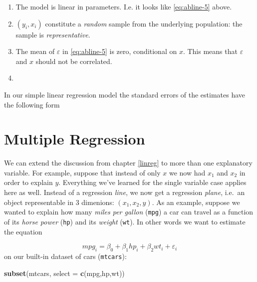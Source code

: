 \documentclass[]{book}
\newenvironment{Shaded}{\begin{snugshade}}{\end{snugshade}}
\newcommand{\KeywordTok}[1]{\textcolor[rgb]{0.13,0.29,0.53}{\textbf{#1}}}
\newcommand{\DataTypeTok}[1]{\textcolor[rgb]{0.13,0.29,0.53}{#1}}
\newcommand{\NormalTok}[1]{#1}
\theoremstyle{definition}
\theoremstyle{definition}
\theoremstyle{definition}
\theoremstyle{remark}
\begin{document}
\begin{enumerate}
\def\labelenumi{\arabic{enumi}.}
\item
  The model is linear in parameters. I.e. it looks like
  \eqref{eq:abline-5} above.
\item
  \((y_i,x_i)\) constitute a \emph{random} sample from the underlying
  population: the sample is \emph{representative}.
\item
  The mean of \(\varepsilon\) in \eqref{eq:abline-5} is zero, conditional
  on \(x\). This means that \(\varepsilon\) and \(x\) should not be
  correlated.
\item
\end{enumerate}

In our simple linear regression model the standard errors of the
estimates have the following form

\chapter{Multiple Regression}\label{multiple-reg}

We can extend the discussion from chapter \ref{linreg} to more than one
explanatory variable. For example, suppose that instead of only \(x\) we
now had \(x_1\) and \(x_2\) in order to explain \(y\). Everything we've
learned for the single variable case applies here as well. Instead of a
regression \emph{line}, we now get a regression \emph{plane}, i.e.~an
object representable in 3 dimenions: \((x_1,x_2,y)\). As an example,
suppose we wanted to explain how many \emph{miles per gallon}
(\texttt{mpg}) a car can travel as a function of its \emph{horse power}
(\texttt{hp}) and its \emph{weight} (\texttt{wt}). In other words we
want to estimate the equation

\[
mpg_i = \beta_0 + \beta_1 hp_i + \beta_2 wt_i + \varepsilon_i \label{eq:abline2d}
\] on our built-in dataset of cars (\texttt{mtcars}):

\begin{Shaded}
\begin{Highlighting}[]
\KeywordTok{subset}\NormalTok{(mtcars, }\DataTypeTok{select =} \KeywordTok{c}\NormalTok{(mpg,hp,wt))}
\end{Highlighting}
\end{Shaded}
\end{document}
